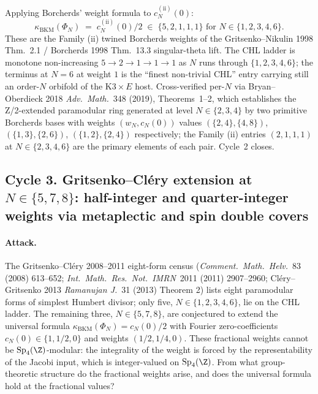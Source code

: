 Applying Borcherds' weight formula to $c_N^{(\mathrm{ii})}(0)$:
\[
  \kappa_{\mathrm{BKM}}(\Phi_N) \;=\; c_N^{(\mathrm{ii})}(0)/2
  \;\in\; \bigl\{5, 2, 1, 1, 1\bigr\}
    \text{ for } N \in \{1, 2, 3, 4, 6\}.
\]
These are the Family (ii) twined Borcherds weights of the
Gritsenko--Nikulin 1998 Thm.~2.1 / Borcherds 1998 Thm.~13.3
singular-theta lift. The CHL ladder is monotone non-increasing
$5 \to 2 \to 1 \to 1 \to 1$ as $N$ runs through $\{1, 2, 3, 4, 6\}$;
the terminus at $N = 6$ at weight $1$ is the ``finest non-trivial
CHL'' entry carrying still an order-$N$ orbifold of the
$\mathrm{K3} \times E$ host. Cross-verified per-$N$ via Bryan--
Oberdieck 2018 \emph{Adv.\ Math.}~348 (2019), Theorems~1--2, which
establishes the Z/2-extended paramodular ring generated at level
$N \in \{2, 3, 4\}$ by two primitive Borcherds bases with weights
$(w_N, c_N(0))$ values $(\{2, 4\}, \{4, 8\})$, $(\{1, 3\}, \{2, 6\})$,
$(\{1, 2\}, \{2, 4\})$ respectively; the Family (ii) entries
$(2, 1, 1, 1)$ at $N \in \{2, 3, 4, 6\}$ are the primary elements
of each pair. Cycle~2 closes.

\subsection*{Cycle 3. Gritsenko--Cl\'ery extension at $N \in
  \{5, 7, 8\}$: half-integer and quarter-integer weights via
  metaplectic and spin double covers}

\paragraph{Attack.} The Gritsenko--Cl\'ery 2008--2011 eight-form
census (\emph{Comment.\ Math.\ Helv.}~83 (2008) 613--652;
\emph{Int.\ Math.\ Res.\ Not.\ IMRN}~2011 (2011) 2907--2960;
Cl\'ery--Gritsenko 2013 \emph{Ramanujan J.}~31 (2013) Theorem 2)
lists eight paramodular forms of simplest Humbert divisor; only
five, $N \in \{1, 2, 3, 4, 6\}$, lie on the CHL ladder. The
remaining three, $N \in \{5, 7, 8\}$, are conjectured to extend
the universal formula $\kappa_{\mathrm{BKM}}(\Phi_N) = c_N(0)/2$
with Fourier zero-coefficients $c_N(0) \in \{1, 1/2, 0\}$ and
weights $(1/2, 1/4, 0)$. These fractional weights cannot be
$\mathrm{Sp}_4(\Z)$-modular: the integrality of the weight is
forced by the representability of the Jacobi input, which is
integer-valued on $\mathrm{Sp}_4(\Z)$. From what group-theoretic
structure do the fractional weights arise, and does the universal
formula hold at the fractional values?

